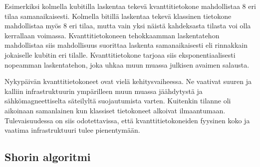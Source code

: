 Esimerkiksi kolmella kubitilla laskentaa tekevä kvanttitietokone mahdollistaa 8 eri tilaa samanaikaisesti. Kolmella bitillä laskentaa tekevä klassinen tietokone mahdollistaa myös 8 eri tilaa, mutta vain yksi näistä kahdeksasta tilasta voi olla kerrallaan voimassa. Kvanttitietokoneen tehokkaamman laskentatehon mahdollistaa siis mahdollisuus suorittaa laskenta samanaikaisesti eli rinnakkain jokaiselle kubitin eri tilalle. Kvanttitietokone tarjoaa siis eksponentiaalisesti nopeamman laskentatehon, joka uhkaa muun muassa julkisen avaimen salausta.

Nykypäivän kvanttitietokoneet ovat vielä kehitysvaiheessa. Ne vaativat suuren ja kalliin infrastruktuurin ympärilleen muun muassa jäähdytystä ja sähkömagneettiselta säteilyltä suojautumista varten. Kuitenkin tilanne oli aikoinaan samanlainen kun klassiset tietokoneet alkoivat ilmaantumaan. Tulevaisuudessa on siis odotettavissa, että kvanttitietokoneiden fyysinen koko ja vaatima infrastruktuuri tulee pienentymään.

\subsection{Shorin algoritmi}
